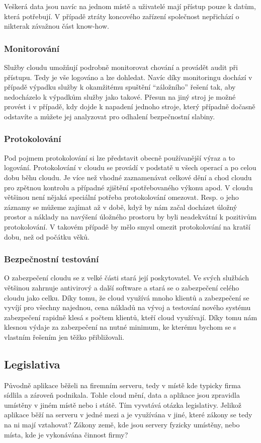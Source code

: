 Veškerá data jsou navíc na jednom místě a uživatelé mají přístup pouze k datům, která potřebují. V případě ztráty koncového zařízení společnost nepřichází o nikterak závažnou část know-how.

\subsubsection{Monitorování}
Služby cloudu umožňují podrobně monitorovat chování a provádět audit při přístupu. Tedy je vše logováno a lze dohledat. Navíc díky monitoringu dochází v případě výpadku služby k okamžitému spuštění "`záložního"' řešení tak, aby nedocházelo k výpadkům služby jako takové. Přesun na jiný stroj je možné provést i v případě, kdy dojde k napadení jednoho stroje, který případně dočasně odstavíte a můžete jej analyzovat pro odhalení bezpečnostní slabiny.

\subsubsection{Protokolování}
Pod pojmem protokolování si lze představit obecně používanější výraz a to logování. Protokolování v cloudu se provádí v podstatě u všech operací a po celou dobu běhu cloudu. Je více než vhodné zaznamenávat celkové dění a chod cloudu pro zpětnou kontrolu a případné zjištění spotřebovaného výkonu apod. V cloudu většinou není nějaká speciální potřeba protokolování omezovat. Resp. o jeho záznamy se můžeme zajímat až v době, když by nám začal docházet úložný prostor a náklady na navýšení úložného prostoru by byli neadekvátní k pozitivům protokolování. V takovém případě by mělo smysl omezit protokolování na kratší dobu, než od počátku věků.

\subsubsection{Bezpečnostní testování}
O zabezpečení cloudu se z velké části stará její poskytovatel. Ve svých službách většinou zahrnuje antivirový a další software a stará se o zabezpečení celého cloudu jako celku. Díky tomu, že cloud využívá mnoho klientů a zabezpečení se vyvíjí pro všechny najednou, cena nákladů na vývoj a testování nového systému zabezpečení rapidně klesá s počtem klientů, kteří cloud využívají. Díky tomu nám klesnou výdaje za zabezpečení na nutné minimum, ke kterému bychom se s vlastním řešením jen těžko přibližovali.

\subsection{Legislativa}
Původně aplikace běželi na firemním serveru, tedy v místě kde typicky firma sídlila a zároveň podnikala. Tohle cloud mění, data a aplikace jsou zpravidla umístěny v jiném místě nebo i státě. Tím vyvstává otázka legislativy. Jelikož aplikace běží na serveru v jedné mezi a je využívána v jiné, které zákony se tedy na ni mají vztahovat? Zákony země, kde jsou servery fyzicky umístěny, nebo místa, kde je vykonávána činnost firmy?

